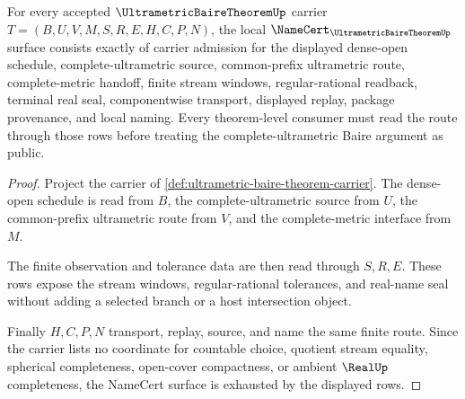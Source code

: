 \begin{theorem}
\label{thm:ultrametric-baire-theorem-namecert-obligations}
For every accepted $\UltrametricBaireTheoremUp$ carrier $T=(B,U,V,M,S,R,E,H,C,P,N)$, the local $\NameCert_{\UltrametricBaireTheoremUp}$ surface consists exactly of carrier admission for the displayed dense-open schedule, complete-ultrametric source, common-prefix ultrametric route, complete-metric handoff, finite stream windows, regular-rational readback, terminal real seal, componentwise transport, displayed replay, package provenance, and local naming. Every theorem-level consumer must read the route through those rows before treating the complete-ultrametric Baire argument as public.
\end{theorem}
\begin{proof}
Project the carrier of \autoref{def:ultrametric-baire-theorem-carrier}. The dense-open schedule is read from $B$, the complete-ultrametric source from $U$, the common-prefix ultrametric route from $V$, and the complete-metric interface from $M$.

The finite observation and tolerance data are then read through $S,R,E$. These rows expose the stream windows, regular-rational tolerances, and real-name seal without adding a selected branch or a host intersection object.

Finally $H,C,P,N$ transport, replay, source, and name the same finite route. Since the carrier lists no coordinate for countable choice, quotient stream equality, spherical completeness, open-cover compactness, or ambient $\RealUp$ completeness, the NameCert surface is exhausted by the displayed rows.
\end{proof}



